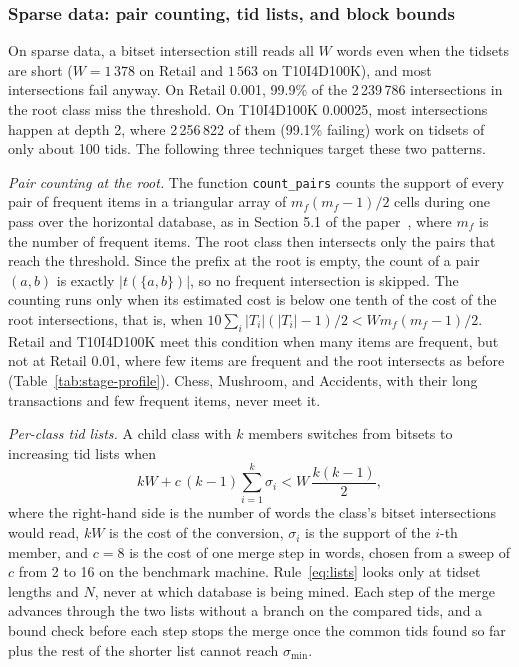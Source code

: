 \subsubsection{Sparse data: pair counting, tid lists, and block bounds}
On sparse data, a bitset intersection still reads all $W$ words even when the tidsets are
short ($W = 1\,378$ on Retail and $1\,563$ on T10I4D100K), and most intersections fail
anyway. On Retail 0.001, 99.9\% of the 2\,239\,786 intersections in the root class miss
the threshold. On T10I4D100K 0.00025, most intersections happen at depth 2, where
2\,256\,822 of them (99.1\% failing) work on tidsets of only about 100 tids. The following
three techniques target these two patterns.

\emph{Pair counting at the root.} The function \texttt{count\_pairs} counts the support
of every pair of frequent items in a triangular array of $m_f(m_f-1)/2$ cells during one
pass over the horizontal database, as in Section 5.1 of the paper~\cite{zaki2000}, where
$m_f$ is the number of frequent items. The root class then intersects only the pairs that
reach the threshold. Since the prefix at the root is empty, the count of a pair $(a, b)$
is exactly $|t(\{a, b\})|$, so no frequent intersection is skipped. The counting runs only
when its estimated cost is below one tenth of the cost of the root intersections, that
is, when
$10 \sum_i |T_i|(|T_i| - 1)/2 < W m_f(m_f-1)/2$. Retail and T10I4D100K meet this
condition when many items are frequent, but not at Retail 0.01, where few items are
frequent and the root intersects as before (Table~\ref{tab:stage-profile}). Chess,
Mushroom, and Accidents, with their long transactions and few frequent items, never meet
it.

\emph{Per-class tid lists.} A child class with $k$ members switches from bitsets to
increasing tid lists when
\begin{equation}
  kW + c\,(k - 1) \sum_{i=1}^{k} \sigma_i < W\,\frac{k(k-1)}{2},
  \label{eq:lists}
\end{equation}
where the right-hand side is the number of words the class's bitset intersections would
read, $kW$ is the cost of the conversion, $\sigma_i$ is the support of the $i$-th
member, and $c = 8$ is the cost of one merge step in words, chosen from a sweep of $c$
from 2 to 16 on the benchmark machine. Rule~\eqref{eq:lists} looks only at tidset lengths
and $N$, never at which database is being mined. Each step of the merge advances through the two
lists without a branch on the compared tids, and a bound check before each step stops the
merge once the common tids found so far plus the rest of the shorter list cannot reach
$\sigma_{\min}$.

